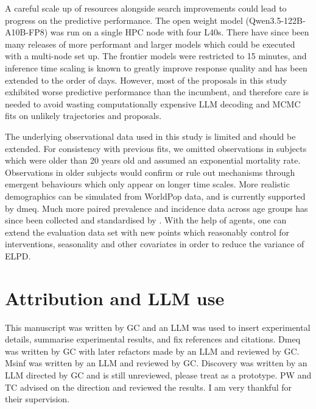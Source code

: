 \documentclass[11pt]{article}
\begin{document}
A careful scale up of resources alongside search improvements could lead to progress on the predictive performance. The open weight model (Qwen3.5-122B-A10B-FP8) was run on a single HPC node with four L40s. There have since been many releases of more performant and larger models which could be executed with a multi-node set up. The frontier models were restricted to 15 minutes, and inference time scaling is known to greatly improve response quality and has been extended to the order of days. However, most of the proposals in this study exhibited worse predictive performance than the incumbent, and therefore care is needed to avoid wasting computationally expensive LLM decoding and MCMC fits on unlikely trajectories and proposals.

The underlying observational data used in this study is limited and should be extended. For consistency with previous fits, we omitted observations in subjects which were older than 20 years old and assumed an exponential mortality rate. Observations in older subjects would confirm or rule out mechanisms through emergent behaviours which only appear on longer time scales. More realistic demographics can be simulated from WorldPop data, and is currently supported by dmeq. Much more paired prevalence and incidence data across age groups has since been collected and standardised by \citet{Battle2015Aug}. With the help of agents, one can extend the evaluation data set with new points which reasonably control for interventions, seasonality and other covariates in order to reduce the variance of ELPD.

\section*{Attribution and LLM use}

This manuscript was written by GC and an LLM was used to insert experimental details, summarise experimental results, and fix references and citations. Dmeq was written by GC with later refactors made by an LLM and reviewed by GC. Msinf was written by an LLM and reviewed by GC. Discovery was written by an LLM directed by GC and is still unreviewed, please treat as a prototype. PW and TC advised on the direction and reviewed the results. I am very thankful for their supervision.

\newpage




\newpage

\appendix
\end{document}
